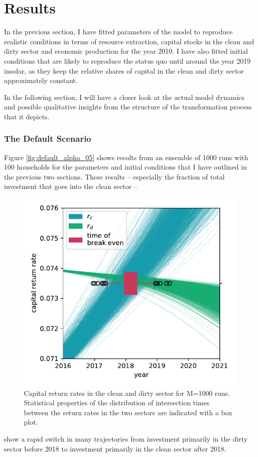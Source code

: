 \newpage






\cleardoublepage
\section{Results}  
In the previous section, I have fitted parameters of the model to reproduce realistic conditions in terms of resource extraction, capital stocks in the clean and dirty sector and economic production for the year 2010. I have also fitted initial conditions that are likely to reproduce the status quo until around the year 2019 insofar, as they keep the relative shares of capital in the clean and dirty sector approximately constant. 

In the following section, I will have a closer look at the actual model dynamics and possible qualitative insights from the structure of the transformation process that it depicts.

\subsubsection{The Default Scenario}
Figure \ref{fig:default_alpha_05} shows results from an ensemble of 1000 runs with 100 households for the parameters and initial conditions that I have outlined in the previous two sections. These results -- especially the fraction of total investment that goes into the clean sector -- 
\begin{figure}
	\vspace{-.1 cm}
        \hspace{-1.8 cm}
        \includegraphics[width = .64 \textwidth]{./figures/break_even.pdf}
        \caption{Capital return rates in the clean and dirty sector for M=1000 runs. Statistical properties of the distribution of intersection times between the return rates in the two sectors are indicated with a box plot.\label{fig:break_even}}
\end{figure}
show a rapid switch in many trajectories from investment primarily in the dirty sector before 2018 to investment primarily in the clean sector after 2018. 

